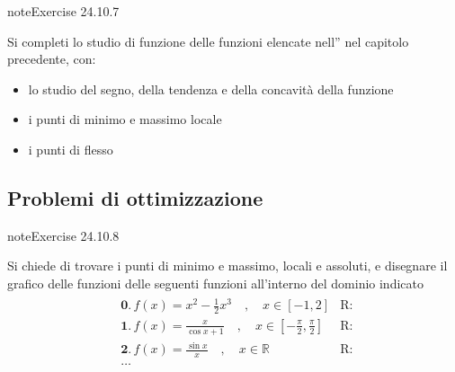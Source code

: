 \documentclass[letterpaper,10pt,italian]{jupyterBook}
\begin{document}
\begin{sphinxadmonition}{note}{Exercise 24.10.7}



\sphinxAtStartPar
Si completi lo studio di funzione delle funzioni elencate nell”{\hyperref[\detokenize{ch/infinitesimal_calculus/analysis-problems:infinitesimal-calculus-analysis-problems-funs}]{}} nel capitolo precedente, con:
\begin{itemize}
\item {} 
\sphinxAtStartPar
lo studio del segno, della tendenza e della concavità della funzione

\item {} 
\sphinxAtStartPar
i punti di minimo e massimo locale

\item {} 
\sphinxAtStartPar
i punti di flesso

\end{itemize}
\end{sphinxadmonition}


\subsection{Problemi di ottimizzazione}
\label{\detokenize{ch/infinitesimal_calculus/derivatives-problems:problemi-di-ottimizzazione}}\label{\detokenize{ch/infinitesimal_calculus/derivatives-problems:infinitesimal-calculus-derivatives-problems-opt}} \label{exercise:ch/infinitesimal_calculus/derivatives-problems-exercise-7}

\begin{sphinxadmonition}{note}{Exercise 24.10.8}



\sphinxAtStartPar
Si chiede di trovare i punti di minimo e massimo, locali e assoluti, e disegnare il grafico delle funzioni delle seguenti funzioni all’interno del dominio indicato
\begin{equation*}
\begin{split}\begin{aligned}
 & \mathbf{0.} \, f(x) = x^2 - \frac{1}{2} x^3 \quad , \quad x \in [-1,2] & \text{R: } \\
 & \mathbf{1.} \, f(x) = \frac{x}{\cos x + 1}  \quad , \quad x \in \left[ -\frac{\pi}{2}, \frac{\pi}{2} \right]  & \text{R: } \\
 & \mathbf{2.} \, f(x) = \frac{\sin{x}}{x} \quad , \quad x \in \mathbb{R} & \text{R: } \\
 & \dots 
\end{aligned}\end{split}
\end{equation*}
\sphinxAtStartPar
{} 
\end{sphinxadmonition}
 \label{exercise:ch/infinitesimal_calculus/derivatives-problems-exercise-8}
\end{document}
